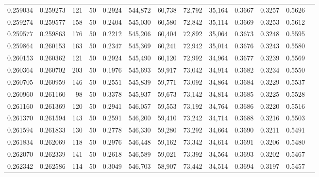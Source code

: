 \begin{tabular}{rrrrrrrrrrrrr}
0.259034 & 0.259273 &   121 &  50 &                                     0.2924 & 544,872 &  60,738 &  72,792 &  35,164 & 0.3667 & 0.3257 & 0.5626 \\
0.259274 & 0.259577 &   158 &  50 &                                     0.2404 & 545,030 &  60,580 &  72,842 &  35,114 & 0.3669 & 0.3253 & 0.5612 \\
0.259577 & 0.259863 &   176 &  50 &                                     0.2212 & 545,206 &  60,404 &  72,892 &  35,064 & 0.3673 & 0.3248 & 0.5595 \\
0.259864 & 0.260153 &   163 &  50 &                                     0.2347 & 545,369 &  60,241 &  72,942 &  35,014 & 0.3676 & 0.3243 & 0.5580 \\
0.260153 & 0.260362 &   121 &  50 &                                     0.2924 & 545,490 &  60,120 &  72,992 &  34,964 & 0.3677 & 0.3239 & 0.5569 \\
0.260364 & 0.260702 &   203 &  50 &                                     0.1976 & 545,693 &  59,917 &  73,042 &  34,914 & 0.3682 & 0.3234 & 0.5550 \\
0.260705 & 0.260959 &   146 &  50 &                                     0.2551 & 545,839 &  59,771 &  73,092 &  34,864 & 0.3684 & 0.3229 & 0.5537 \\
0.260960 & 0.261160 &    98 &  50 &                                     0.3378 & 545,937 &  59,673 &  73,142 &  34,814 & 0.3685 & 0.3225 & 0.5528 \\
0.261160 & 0.261369 &   120 &  50 &                                     0.2941 & 546,057 &  59,553 &  73,192 &  34,764 & 0.3686 & 0.3220 & 0.5516 \\
0.261370 & 0.261594 &   143 &  50 &                                     0.2591 & 546,200 &  59,410 &  73,242 &  34,714 & 0.3688 & 0.3216 & 0.5503 \\
0.261594 & 0.261833 &   130 &  50 &                                     0.2778 & 546,330 &  59,280 &  73,292 &  34,664 & 0.3690 & 0.3211 & 0.5491 \\
0.261834 & 0.262069 &   118 &  50 &                                     0.2976 & 546,448 &  59,162 &  73,342 &  34,614 & 0.3691 & 0.3206 & 0.5480 \\
0.262070 & 0.262339 &   141 &  50 &                                     0.2618 & 546,589 &  59,021 &  73,392 &  34,564 & 0.3693 & 0.3202 & 0.5467 \\
0.262342 & 0.262586 &   114 &  50 &                                     0.3049 & 546,703 &  58,907 &  73,442 &  34,514 & 0.3694 & 0.3197 & 0.5457 \\

\end{tabular}
